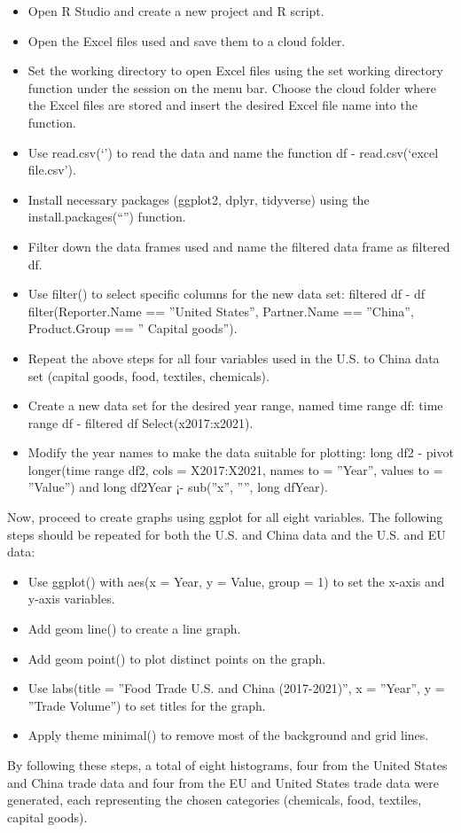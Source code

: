\documentclass[12pt]{article}
\begin{document}
\begin{itemize}
    \item Open R Studio and create a new project and R script.
    \item Open the Excel files used and save them to a cloud folder.
    \item Set the working directory to open Excel files using the set working directory function under the session on the menu bar. Choose the cloud folder where the Excel files are stored and insert the desired Excel file name into the function.
    \item Use read.csv(‘’) to read the data and name the function df - read.csv(‘excel file.csv’).
    \item Install necessary packages (ggplot2, dplyr, tidyverse) using the install.packages(“”) function.
    \item Filter down the data frames used and name the filtered data frame as filtered df.
    \item Use filter() to select specific columns for the new data set: filtered df - df filter(Reporter.Name == ”United States”, Partner.Name == ”China”, Product.Group == ” Capital goods”).
    \item Repeat the above steps for all four variables used in the U.S. to China data set (capital goods, food, textiles, chemicals).
    \item Create a new data set for the desired year range, named time range df: time range df - filtered df Select(x2017:x2021).
    \item Modify the year names to make the data suitable for plotting: long df2 - pivot longer(time range df2, cols = X2017:X2021, names to = ”Year”, values to = ”Value”) and long df2Year ¡- sub(”x”, ””, long dfYear).
\end{itemize}
Now, proceed to create graphs using ggplot for all eight variables. The following steps should be repeated for both the U.S. and China data and the U.S. and EU data:

\begin{itemize}
    \item Use ggplot() with aes(x = Year, y = Value, group = 1) to set the x-axis and y-axis variables.
    \item Add geom line() to create a line graph.
    \item Add geom point() to plot distinct points on the graph.
    \item Use labs(title = ”Food Trade U.S. and China (2017-2021)”, x = ”Year”, y = ”Trade Volume”) to set titles for the graph.
    \item Apply theme minimal() to remove most of the background and grid lines.
\end{itemize}
By following these steps, a total of eight histograms, four from the United States and China trade data and four from the EU and United States trade data were generated, each representing the chosen categories (chemicals, food, textiles, capital goods).
\end{document}
